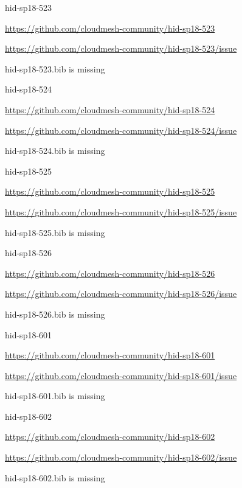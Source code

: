 \begin{IU}

hid-sp18-523

\url{https://github.com/cloudmesh-community/hid-sp18-523}

\url{https://github.com/cloudmesh-community/hid-sp18-523/issue}

hid-sp18-523.bib is missing

\end{IU}


\begin{IU}

hid-sp18-524

\url{https://github.com/cloudmesh-community/hid-sp18-524}

\url{https://github.com/cloudmesh-community/hid-sp18-524/issue}

hid-sp18-524.bib is missing

\end{IU}


\begin{IU}

hid-sp18-525

\url{https://github.com/cloudmesh-community/hid-sp18-525}

\url{https://github.com/cloudmesh-community/hid-sp18-525/issue}

hid-sp18-525.bib is missing

\end{IU}


\begin{IU}

hid-sp18-526

\url{https://github.com/cloudmesh-community/hid-sp18-526}

\url{https://github.com/cloudmesh-community/hid-sp18-526/issue}

hid-sp18-526.bib is missing

\end{IU}


\begin{IU}

hid-sp18-601

\url{https://github.com/cloudmesh-community/hid-sp18-601}

\url{https://github.com/cloudmesh-community/hid-sp18-601/issue}

hid-sp18-601.bib is missing

\end{IU}


\begin{IU}

hid-sp18-602

\url{https://github.com/cloudmesh-community/hid-sp18-602}

\url{https://github.com/cloudmesh-community/hid-sp18-602/issue}

hid-sp18-602.bib is missing

\end{IU}
